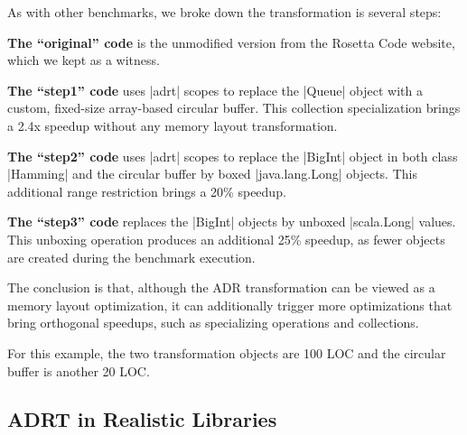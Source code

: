 As with other benchmarks, we broke down the transformation is several steps:

\vspace{0.5em}
\noindent
\textbf{The ``original'' code} is the unmodified version from the Rosetta Code website, which we kept as a witness.

\vspace{0.5em}
\noindent
\textbf{The ``step1'' code} uses |adrt| scopes to replace the |Queue| object with a custom, fixed-size array-based circular buffer. This collection specialization brings a 2.4x speedup without any memory layout transformation.

\vspace{0.5em}
\noindent
\textbf{The ``step2'' code} uses |adrt| scopes to replace the |BigInt| object in both class |Hamming| and the circular buffer by boxed |java.lang.Long| objects. This additional range restriction brings a 20\% speedup.

\vspace{0.5em}
\noindent
\textbf{The ``step3'' code} replaces the |BigInt| objects by unboxed |scala.Long| values. This unboxing operation produces an additional 25\% speedup, as fewer objects are created during the benchmark execution.

The conclusion is that, although the ADR transformation can be viewed as a memory layout optimization, it can additionally trigger more optimizations that bring orthogonal speedups, such as 
specializing operations and collections.

For this example, the two transformation objects are 100 LOC and the circular buffer is another 20 LOC.

\subsection{ADRT in Realistic Libraries}
\label{sec:benchmarks:funcs}


